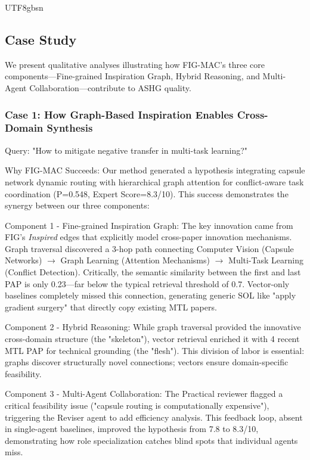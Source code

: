 \documentclass[11pt]{article}
\begin{document}
\begin{CJK}{UTF8}{gbsn}
\subsection{Case Study}
\label{sec:case_study}

We present qualitative analyses illustrating how FIG-MAC's three core components—Fine-grained Inspiration Graph, Hybrid Reasoning, and Multi-Agent Collaboration—contribute to ASHG quality.

\subsubsection{Case 1: How Graph-Based Inspiration Enables Cross-Domain Synthesis}
\label{sec:case1}

Query: "How to mitigate negative transfer in multi-task learning?"

Why FIG-MAC Succeeds: Our method generated a hypothesis integrating capsule network dynamic routing with hierarchical graph attention for conflict-aware task coordination (P=0.548, Expert Score=8.3/10). This success demonstrates the synergy between our three components:

Component 1 - Fine-grained Inspiration Graph: The key innovation came from FIG's \emph{Inspired} edges that explicitly model cross-paper innovation mechanisms. Graph traversal discovered a 3-hop path connecting Computer Vision (Capsule Networks) $\rightarrow$ Graph Learning (Attention Mechanisms) $\rightarrow$ Multi-Task Learning (Conflict Detection). Critically, the semantic similarity between the first and last PAP is only 0.23—far below the typical retrieval threshold of 0.7. Vector-only baselines completely missed this connection, generating generic SOL like "apply gradient surgery" that directly copy existing MTL papers.

Component 2 - Hybrid Reasoning: While graph traversal provided the innovative cross-domain structure (the "skeleton"), vector retrieval enriched it with 4 recent MTL PAP for technical grounding (the "flesh"). This division of labor is essential: graphs discover structurally novel connections; vectors ensure domain-specific feasibility.

Component 3 - Multi-Agent Collaboration: The Practical reviewer flagged a critical feasibility issue ("capsule routing is computationally expensive"), triggering the Reviser agent to add efficiency analysis. This feedback loop, absent in single-agent baselines, improved the hypothesis from 7.8 to 8.3/10, demonstrating how role specialization catches blind spots that individual agents miss.


\end{CJK}
\end{document}
